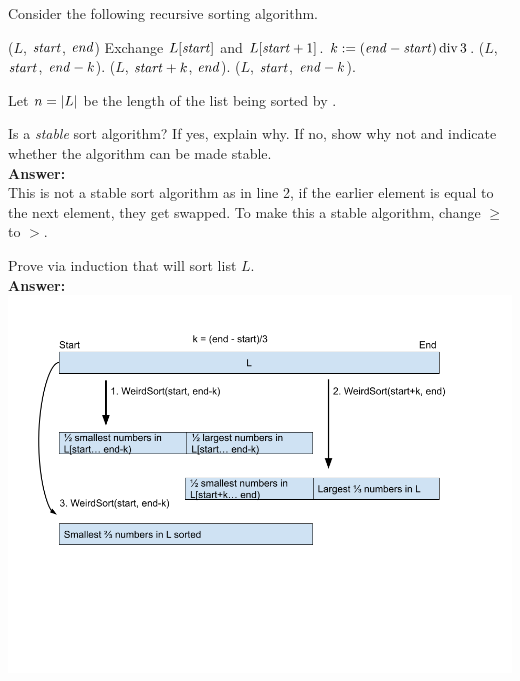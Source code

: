 \begin{problem}
Consider the following recursive sorting algorithm.
\begin{myalgo}{($L$, $\textit{start\/}$, $\textit{end\/}$)}
            \STATE Exchange $L[\textit{start\/}]$ and $L[\textit{start\/} + 1]$.
        \ENDIF
        \STATE $k := (\textit{end\/} - \textit{start\/}) \operatorname{div} 3$.
        \STATE {}($L$, $\textit{start\/}$, $\textit{end\/} - k$).
        \STATE {}($L$, $\textit{start\/} + k$, $\textit{end\/}$).
        \STATE {}($L$, $\textit{start\/}$, $\textit{end\/} - k$).
    \ENDIF
\end{myalgo}
Let $n = \lvert L \rvert$ be the length of the list being sorted by .

\begin{questions}
\item Is  a \emph{stable} sort algorithm? If yes, explain why. If no, show why not and indicate whether the algorithm can be made stable.\\
\textbf{Answer:}\\
This is not a stable sort algorithm as in line 2, if the earlier element is equal to the next element, they get swapped. To make this a stable algorithm, change $\geq$ to $>$.
\item Prove via induction that  will sort list $L$.\\
\textbf{Answer:}\\
\includegraphics[scale=0.5]{question2.png}


\end{questions}
\end{problem}
